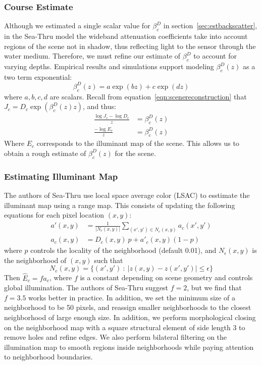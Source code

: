 \documentclass[10pt,twocolumn,letterpaper]{article}
\begin{document}
\subsubsection*{Course Estimate}
Although we estimated a single scalar value for $\beta^D_c$ in section~\ref{sec:estbackscatter},
in the Sea-Thru model the wideband attenuation coefficients take into account regions of the scene
not in shadow, thus reflecting light to the sensor through the
water medium. Therefore, we must refine our estimate of $\beta^D_c$ to account for varying depths.
Empirical results and simulations support modeling $\beta^D_c(z)$ as a two term exponential:
\begin{equation}
\label{eq:attenuation}
    \beta^D_c(z) = a \exp(b z) + c \exp(d z)
\end{equation}
where $a, b, c, d$ are scalars. Recall from equation~\ref{eqn:scenereconstruction} that
$J_c = D_c \exp(\beta_c^D(z)z)$, and thus:
\begin{align}
\label{eqn:courseest}
    \frac{\log{J_c} - \log{D_c}}{z} &= \beta_c^D(z) \nonumber \\
    \frac{-\log{E_c}}{z} &= \beta_c^D(z)
\end{align}
Where $E_c$ corresponds to the illuminant map of the scene. This allows us to obtain
a rough estimate of $\beta_c^D(z)$ for the scene.
\subsubsection*{Estimating Illuminant Map}
The authors of Sea-Thru use local space average color (LSAC) to esstimate the illuminant
map using a range map. This consists of updating the following equations for each pixel
location $(x,y)$:
\begin{align}
    a'(x, y) &= \frac1{|N_\epsilon(x, y)|} \sum_{(x', y') \in N_e(x, y)} {a_c(x', y')} \label{eqn:lsac1} \\
    a_c(x, y) &= D_c(x, y) \ p + a'_c(x, y)(1-p) \label{eqn:lsac2}
\end{align}
where $p$ controls the locality of the neighborhood (default 0.01), and
$N_\epsilon(x, y)$ is the neighborhood of $(x, y)$ such that
\begin{equation}
N_e(x, y) = \lbrace (x', y') \: : \: |z(x, y) - z(x', y')| \leq \epsilon \rbrace
\end{equation}
Then $\hat{E}_c = fa_c$, where $f$ is a constant depending on scene geometry and controls global illumination.
The authors of Sea-Thru suggest $f=2$, but we find that $f=3.5$ works better in practice.
In addition, we set the minimum size of a neighborhood to be 50 pixels, and reassign smaller neighborhoods
to the closest neighborhood of large enough size. In addition, we perform morphological closing on the
neighborhood map with a square structural element of side length 3 to remove holes and refine edges.
We also perform bilateral filtering on the illumination map to smooth regions inside neighborhoods
while paying attention to neighborhood boundaries.
\end{document}
